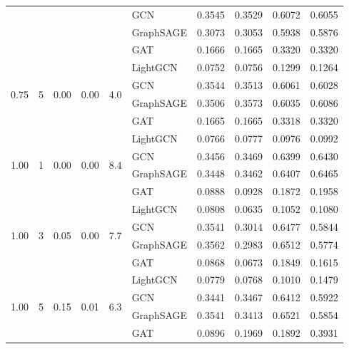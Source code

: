{\begin{longtable}{cccccl rrrr}
 & & & & & GCN & 0.3545 & 0.3529 & 0.6072 & 0.6055 \\
 & & & & & GraphSAGE & 0.3073 & 0.3053 & 0.5938 & 0.5876 \\
 & & & & & GAT & 0.1666 & 0.1665 & 0.3320 & 0.3320 \\
\midrule
\multirow{4}{*}{0.75} & \multirow{4}{*}{5} & \multirow{4}{*}{0.00} & \multirow{4}{*}{0.00} & \multirow{4}{*}{4.0} & LightGCN & 0.0752 & 0.0756 & 0.1299 & 0.1264 \\
 & & & & & GCN & 0.3544 & 0.3513 & 0.6061 & 0.6028 \\
 & & & & & GraphSAGE & 0.3506 & 0.3573 & 0.6035 & 0.6086 \\
 & & & & & GAT & 0.1665 & 0.1665 & 0.3318 & 0.3320 \\
\midrule
\multirow{4}{*}{1.00} & \multirow{4}{*}{1} & \multirow{4}{*}{0.00} & \multirow{4}{*}{0.00} & \multirow{4}{*}{8.4} & LightGCN & 0.0766 & 0.0777 & 0.0976 & 0.0992 \\
 & & & & & GCN & 0.3456 & 0.3469 & 0.6399 & 0.6430 \\
 & & & & & GraphSAGE & 0.3448 & 0.3462 & 0.6407 & 0.6465 \\
 & & & & & GAT & 0.0888 & 0.0928 & 0.1872 & 0.1958 \\
\midrule
\multirow{4}{*}{1.00} & \multirow{4}{*}{3} & \multirow{4}{*}{0.05} & \multirow{4}{*}{0.00} & \multirow{4}{*}{7.7} & LightGCN & 0.0808 & 0.0635 & 0.1052 & 0.1080 \\
 & & & & & GCN & 0.3541 & 0.3014 & 0.6477 & 0.5844 \\
 & & & & & GraphSAGE & 0.3562 & 0.2983 & 0.6512 & 0.5774 \\
 & & & & & GAT & 0.0868 & 0.0673 & 0.1849 & 0.1615 \\
\midrule
\multirow{4}{*}{1.00} & \multirow{4}{*}{5} & \multirow{4}{*}{0.15} & \multirow{4}{*}{0.01} & \multirow{4}{*}{6.3} & LightGCN & 0.0779 & 0.0768 & 0.1010 & 0.1479 \\
 & & & & & GCN & 0.3441 & 0.3467 & 0.6412 & 0.5922 \\
 & & & & & GraphSAGE & 0.3541 & 0.3413 & 0.6521 & 0.5854 \\
 & & & & & GAT & 0.0896 & 0.1969 & 0.1892 & 0.3931 \\
\midrule
\end{longtable}
}

